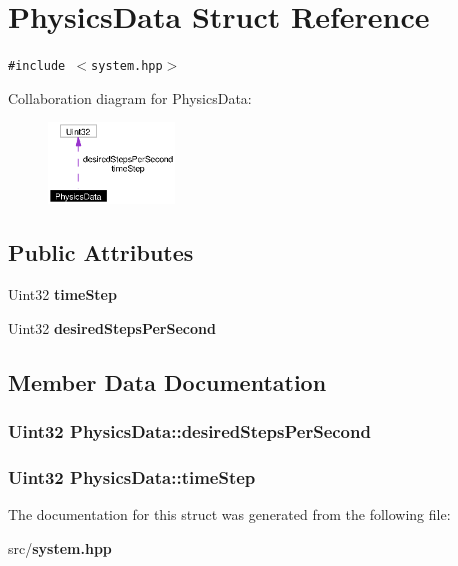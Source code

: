 \section{Physics\-Data Struct Reference}
\label{structPhysicsData}
{\tt \#include $<$system.hpp$>$}

Collaboration diagram for Physics\-Data:\begin{figure}[H]
\begin{center}
\leavevmode
\includegraphics[width=95pt]{structPhysicsData__coll__graph}
\end{center}
\end{figure}
\subsection*{Public Attributes}
\begin{CompactItemize}
\item 
Uint32 {\bf time\-Step}
\item 
Uint32 {\bf desired\-Steps\-Per\-Second}
\end{CompactItemize}


\subsection{Member Data Documentation}
\subsubsection{\setlength{\rightskip}{0pt plus 5cm}Uint32 {\bf Physics\-Data::desired\-Steps\-Per\-Second}}\label{structPhysicsData_o1}


\subsubsection{\setlength{\rightskip}{0pt plus 5cm}Uint32 {\bf Physics\-Data::time\-Step}}\label{structPhysicsData_o0}




The documentation for this struct was generated from the following file:\begin{CompactItemize}
\item 
src/{\bf system.hpp}\end{CompactItemize}

